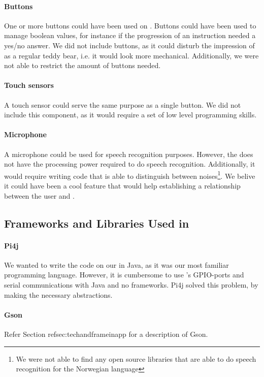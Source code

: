 \paragraph{Buttons}
One or more buttons could have been used on \ab{}. Buttons could have been used to manage boolean values, for instance if the progression of an instruction needed a yes/no answer. We did not include buttons, as it could disturb the impression of \ab{} as a regular teddy bear, i.e. it would look more mechanical. Additionally, we were not able to restrict the amount of buttons needed. 

\paragraph{Touch sensors}
A touch sensor could serve the same purpose as a single button. We did not include this component, as it would require a set of low level programming skills. 

\paragraph{Microphone}
A microphone could be used for speech recognition purposes. However, the \rpi{} does not have the processing power required to do speech recognition. Additionally, it would require writing code that is able to distinguish between noises\footnote{We were not able to find any open source libraries that are able to do speech recognition for the Norwegian language}. We belive it could have been a cool feature that would help establishing a relationship between the user and \ab{}.    

\subsection{Frameworks and Libraries Used in \ab{}} 

\paragraph{Pi4j}
We wanted to write the code on our \rpi{} in Java, as it was our most familiar programming language. However, it is cumbersome to use \rpi{}'s GPIO-ports and serial communications with Java and no frameworks. Pi4j solved this problem, by making the necessary abstractions.

\paragraph{Gson}
Refer Section ref{sec:techandframeinapp} for a description of Gson.    

